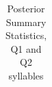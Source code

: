 \begin{longtable}{lrrrrrrrrrr}
\caption{Posterior Summary Statistics, Q1 and Q2 syllables} 
   \label{durStrictus}
\end{longtable}

%





